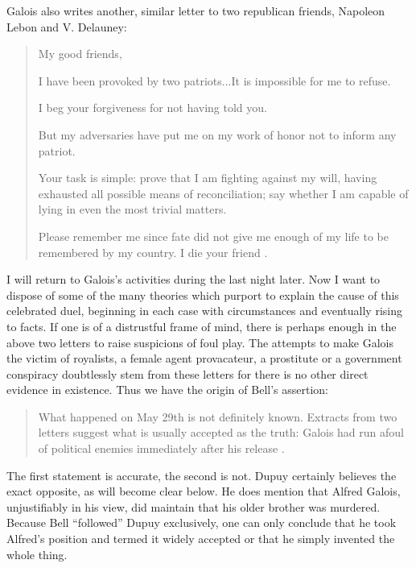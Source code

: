 \documentclass[12pt]{article}
\begin{document}
Galois also writes another, similar letter to two republican friends, Napoleon Lebon and V. Delauney:

\begin{quotation}
\noindent
My good friends, 
\medskip

I have been provoked by two patriots...It is impossible for me to refuse. 

I beg your forgiveness for not having told you. 

But my adversaries have put me on my work of honor not to inform any patriot. 

Your task is simple: prove that I am fighting against my will, having exhausted all possible means of reconciliation; say whether I am capable of lying in even the most trivial matters. 

Please remember me since fate did not give me enough of my life to be remembered by my country. I die your friend \cite{79}.
\end{quotation}

I will return to Galois's activities during the last night later. Now I want to dispose of some of the many theories which purport to explain the cause of this celebrated duel, beginning in each case with circumstances and eventually rising to facts. If one is of a distrustful frame of mind, there is perhaps enough in the above two letters to raise suspicions of foul play. The attempts to make Galois the victim of royalists, a female agent provacateur, a prostitute or a government conspiracy doubtlessly stem from these letters for there is no other direct evidence in existence. Thus we have the origin of Bell's assertion:

\begin{quote}
What happened on May 29th is not definitely known. Extracts from two letters suggest what is usually accepted as the truth: Galois had run afoul of political enemies immediately after his release \cite{80}.
\end{quote}

The first statement is accurate, the second is not. Dupuy certainly believes the exact opposite, as will become clear below. He does mention that Alfred Galois, unjustifiably in his view, did maintain that his older brother was murdered. Because Bell ``followed'' Dupuy exclusively, one can only conclude that he took Alfred's position and termed it widely accepted or that he simply invented the whole thing.
\end{document}
